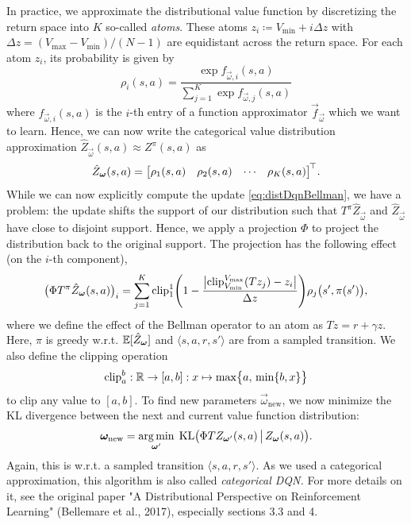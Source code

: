 			In practice, we approximate the distributional value function by discretizing the return space into \(K\) so-called \emph{atoms}. These atoms \( z_i \coloneqq V_\mathrm{min} + i {\Delta z} \) with \( {\Delta z} = (V_\mathrm{max} - V_\mathrm{min}) / (N - 1) \) are equidistant across the return space. For each atom \(z_i\), its probability is given by
			\begin{equation}
				\rho_i(s, a) = \frac{\exp f_{\vec{\omega}, i}(s, a)}{\sum_{j = 1}^{K} \exp f_{\vec{\omega}, j}(s, a)}
			\end{equation}
			where \( f_{\vec{\omega}, i}(s, a) \) is the \(i\)-th entry of a function approximator \( \vec{f}_{\vec{\omega}} \) which we want to learn. Hence, we can now write the categorical value distribution approximation \( \hat{Z}_{\vec{\omega}}(s, a) \approx Z^\pi(s, a) \) as
			\begin{equation}
				\hat{Z}_{\bm{\omega}}(s, a) = \begin{bmatrix} \rho_1(s, a) & \rho_2(s, a) & \cdots & \rho_K(s, a) \end{bmatrix}^{\!\top\!}.
			\end{equation}
			While we can now explicitly compute the update \eqref{eq:distDqnBellman}, we have a problem: the update shifts the support of our distribution such that \( T^\pi \hat{Z}_{\vec{\omega}} \) and \( \hat{Z}_{\vec{\omega}} \) have close to disjoint support. Hence, we apply a projection \(\Phi\) to project the distribution back to the original support. The projection has the following effect (on the \(i\)-th component),
			\begin{equation}
				\bigl( \Phi T^\pi \hat{Z}_{\bm{\omega}}(s, a) \bigr)_i = \sum_{j = 1}^{K} \operatorname{clip}_1^1\Biggl( 1 - \frac{\bigl\lvert \operatorname{clip}_{V_\mathrm{min}}^{V_\mathrm{max}}(T z_j) -  z_i \bigr\vert}{{\Delta z}} \Biggr) \rho_j\bigl(s', \pi(s')\bigr),
			\end{equation}
			where we define the effect of the Bellman operator to an atom as \( T z = r + \gamma z \). Here, \(\pi\) is greedy w.r.t. \( \mathbb{E}[\hat{Z}_{\bm{\omega}}] \) and \(\langle s, a, r, s' \rangle\) are from a sampled transition. We also define the clipping operation
			\begin{equation}
				\operatorname{clip}_a^b : \mathbb{R} \to [a, b] : x \mapsto \max\bigl\{ a,\, \min\{ b, x \} \bigr\}
			\end{equation}
			to clip any value to \([a, b]\). To find new parameters \( \vec{\omega}_\mathrm{new} \), we now minimize the \ac{KL} divergence between the next and current value function distribution:
			\begin{equation}
				\bm{\omega}_\mathrm{new} = \operatorname*{arg\,min}_{\bm{\omega}'} \; \operatorname{KL}\bigl( \Phi T Z_{\bm{\omega}'}(s, a) \,\big\vert\, Z_{\bm{\omega}}(s, a) \bigr).
			\end{equation}
			Again, this is w.r.t. a sampled transition \(\langle s, a, r, s' \rangle\). As we used a categorical approximation, this algorithm is also called \emph{categorical \ac{DQN}.} For more details on it, see the original paper "A Distributional Perspective on Reinforcement Learning" (Bellemare et al., 2017), especially sections 3.3 and 4.

